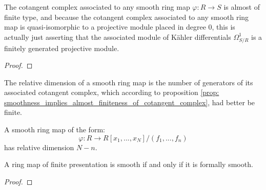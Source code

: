                 \begin{proposition} \label{prop: smoothness_implies_almost_finiteness_of_cotangent_complex}
                    The cotangent complex associated to any smooth ring map $\varphi: R \to S$ is almost of finite type, and because the cotangent complex associated to any smooth ring map is quasi-isomorphic to a projective module placed in degree $0$, this is actually just asserting that the associated module of K\"ahler differentials $\Omega^1_{S/R}$ is a finitely generated projective module.
                \end{proposition}
                    \begin{proof}
                    
                    \end{proof}
                \begin{corollary}
                    The relative dimension of a smooth ring map is the number of generators of its associated cotangent complex, which according to proposition \ref{prop: smoothness_implies_almost_finiteness_of_cotangent_complex}, had better be finite.
                \end{corollary}
                \begin{example}
                    A smooth ring map of the form:
                        $$\varphi: R \to R[x_1, ..., x_N]/(f_1, ..., f_n)$$
                    has relative dimension $N - n$. 
                \end{example}
                
                \begin{proposition} \label{prop: smooth_iff_formally_smooth_and_of_finite_presentation}
                    A ring map of finite presentation is smooth if and only if it is formally smooth.
                \end{proposition}
                    \begin{proof}
                        
                    \end{proof}
                
